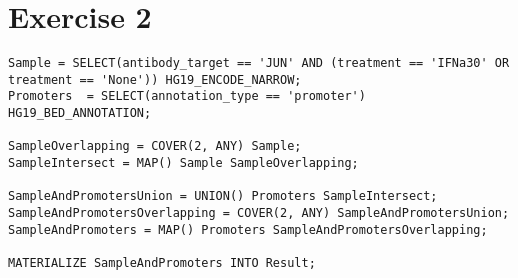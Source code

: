 \documentclass[11pt]{article} %
\begin{document}
\section{Exercise 2}

\begin{lstlisting}
Sample = SELECT(antibody_target == 'JUN' AND (treatment == 'IFNa30' OR treatment == 'None')) HG19_ENCODE_NARROW;
Promoters  = SELECT(annotation_type == 'promoter') HG19_BED_ANNOTATION;

SampleOverlapping = COVER(2, ANY) Sample;
SampleIntersect = MAP() Sample SampleOverlapping;

SampleAndPromotersUnion = UNION() Promoters SampleIntersect;
SampleAndPromotersOverlapping = COVER(2, ANY) SampleAndPromotersUnion;
SampleAndPromoters = MAP() Promoters SampleAndPromotersOverlapping;

MATERIALIZE SampleAndPromoters INTO Result;
\end{lstlisting}
\end{document}
